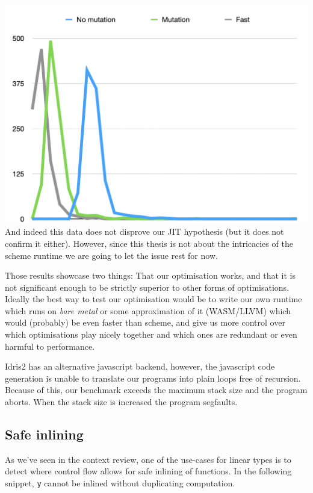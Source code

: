 \documentclass[
]{article}
\begin{document}
\includegraphics{Screenshot 2020-08-25 at 17.59.21.png} And indeed this
data does not disprove our JIT hypothesis (but it does not confirm it
either). However, since this thesis is not about the intricacies of the
scheme runtime we are going to let the issue rest for now.

Those results showcase two things: That our optimisation works, and that
it is not significant enough to be strictly superior to other forms of
optimisations. Ideally the best way to test our optimisation would be to
write our own runtime which runs on \emph{bare metal} or some
approximation of it (WASM/LLVM) which would (probably) be even faster
than scheme, and give us more control over which optimisations play
nicely together and which ones are redundant or even harmful to
performance.

Idris2 has an alternative javascript backend, however, the javascript
code generation is unable to translate our programs into plain loops
free of recursion. Because of this, our benchmark exceeds the maximum
stack size and the program aborts. When the stack size is increased the
program segfaults.

\hypertarget{safe-inlining}{%
\subsection{Safe inlining}\label{safe-inlining}}

As we've seen in the context review, one of the use-cases for linear
types is to detect where control flow allows for safe inlining of
functions. In the following snippet, \texttt{y} cannot be inlined
without duplicating computation.
\end{document}
